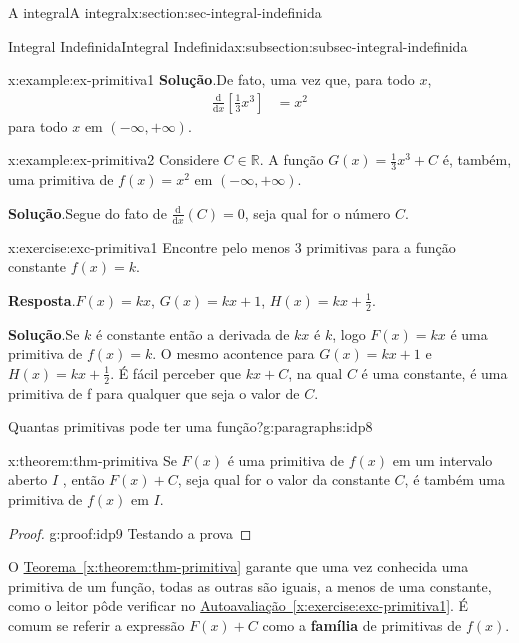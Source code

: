 \documentclass[oneside,10pt,]{article}
\newcommand{\blocktitlefont}{\relax}
\newcommand{\xreffont}{\relax}
\newcommand{\terminology}[1]{\textbf{#1}}
\numberwithin{equation}{section}
\newcommand{\dd}{\mathrm{d}}
\newcommand{\amp}{&}
\begin{document}
\begin{sectionptx}{A integral}{}{A integral}{}{}{x:section:sec-integral-indefinida}
\begin{subsectionptx}{Integral Indefinida}{}{Integral Indefinida}{}{}{x:subsection:subsec-integral-indefinida}
\begin{example}{}{x:example:ex-primitiva1}
\noindent\textbf{\blocktitlefont Solução}.\hypertarget{g:solution:idp4}{}\quad{}De fato, uma vez que, para todo \(x\),%
\begin{align*}
\frac{\dd}{\dd x}\left[\frac{1}{3}x^3\right]\amp = x^2
\end{align*}
para todo \(x\) em \((-\infty, +\infty)\).%
\end{example}
\begin{example}{}{x:example:ex-primitiva2}%
Considere \(C \in \mathbb{R}\). A função \(G(x)= \frac{1}{3}x^3 + C\) é, também, uma primitiva de \(f(x)=x^2\) em \((-\infty, +\infty)\).%
\par\smallskip%
\noindent\textbf{\blocktitlefont Solução}.\hypertarget{g:solution:idp5}{}\quad{}Segue do fato de \(\frac{\dd}{\dd x}(C)=0\), seja qual for o número \(C\).%
\end{example}
\begin{inlineexercise}{}{x:exercise:exc-primitiva1}%
Encontre pelo menos 3 primitivas para a função constante \(f(x)=k\).%
\par\smallskip%
\noindent\textbf{\blocktitlefont Resposta}.\hypertarget{g:answer:idp6}{}\quad{}\(F(x)=kx\), \(G(x)=kx +1\), \(H(x)=kx+\frac{1}{2}\).%
\par\smallskip%
\noindent\textbf{\blocktitlefont Solução}.\hypertarget{g:solution:idp7}{}\quad{}Se \(k\) é constante então a derivada de \(kx\) é \(k\), logo \(F(x)=kx\) é uma primitiva de \(f(x)=k\). O mesmo acontence  para \(G(x)=kx +1\) e \(H(x)=kx+\frac{1}{2}\). É fácil perceber que \(kx+C\), na qual \(C\) é uma constante, é uma primitiva de f para qualquer que seja o valor de \(C\).%
\end{inlineexercise}
\begin{paragraphs}{Quantas  primitivas pode ter uma função?}{g:paragraphs:idp8}%
\end{paragraphs}%
\begin{theorem}{}{}{x:theorem:thm-primitiva}%
Se  \(F(x)\) é uma primitiva de \(f(x)\) em um intervalo aberto \(I\) , então \(F(x) + C\), seja qual for o valor da constante \(C\), é também uma primitiva de \(f(x)\) em \(I\).%
\begin{proof}{}{g:proof:idp9}
Testando a prova%
\end{proof}
\end{theorem}
O  \hyperref[x:theorem:thm-primitiva]{Teorema~{\xreffont\ref{x:theorem:thm-primitiva}}} garante que uma vez conhecida uma primitiva de um função, todas as outras são iguais, a menos de uma constante, como o leitor pôde verificar no \hyperref[x:exercise:exc-primitiva1]{Autoavaliação~{\xreffont\ref{x:exercise:exc-primitiva1}}}. É comum se referir a expressão \(F(x)+C\) como a \terminology{família}  de primitivas de \(f(x)\).%

\end{subsectionptx}
\end{sectionptx}
\end{document}
